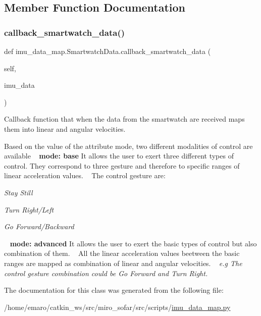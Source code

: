 \subsection{Member Function Documentation}
\mbox{\label{classimu__data__map_1_1SmartwatchData_ad7bedaa8d67da50b9db0b9d0984816d0}} 
\subsubsection{\texorpdfstring{callback\+\_\+smartwatch\+\_\+data()}{callback\_smartwatch\_data()}}
{\footnotesize\ttfamily def imu\+\_\+data\+\_\+map.\+Smartwatch\+Data.\+callback\+\_\+smartwatch\+\_\+data (\begin{DoxyParamCaption}\item[{}]{self,  }\item[{}]{imu\+\_\+data }\end{DoxyParamCaption})}



Callback function that when the data from the smartwatch are received maps them into linear and angular velocities. 

Based on the value of the attribute mode, two different modalities of control are available ~\newline
 {\bfseries{mode\+: base}}  It allows the user to exert three different types of control. They correspond to three gesture and therefore to specific ranges of linear acceleration values. ~\newline
 The control gesture are\+: 
\begin{DoxyItemize}
\item {\itshape Stay Still} 
\item {\itshape Turn Right/\+Left} 
\item {\itshape Go Forward/\+Backward}
\end{DoxyItemize} ~\newline
 {\bfseries{mode\+: advanced}}  It allows the user to exert the basic types of control but also combination of them. ~\newline
 All the linear acceleration values beetween the basic ranges are mapped as combination of linear and angular velocities. ~\newline
{\itshape  e.\+g The control gesture combination could be Go Forward and Turn Right.}  

The documentation for this class was generated from the following file\+:\begin{DoxyCompactItemize}
\item 
/home/emaro/catkin\+\_\+ws/src/miro\+\_\+sofar/src/scripts/\mbox{\hyperlink{imu__data__map_8py}{imu\+\_\+data\+\_\+map.\+py}}\end{DoxyCompactItemize}

